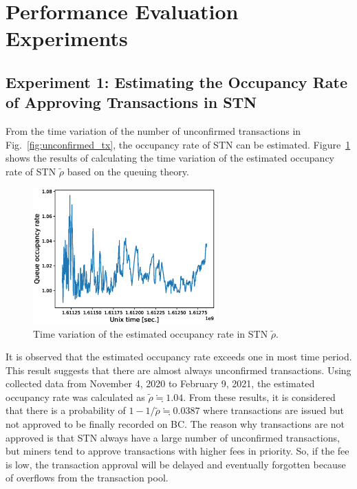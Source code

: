 \documentclass[graybox]{svmult}
\begin{document}
\section{Performance Evaluation Experiments}
\label{sec:experiments}

\subsection{Experiment 1: Estimating the Occupancy Rate of Approving Transactions in STN}
\label{sec:occupancyrate}

From the time variation of the number of unconfirmed transactions in Fig.~\ref{fig:unconfirmed_tx}, the occupancy rate of STN can be estimated. 
Figure~\ref{fig:occupancyrate} shows the results of calculating the time variation of the estimated occupancy rate of STN $\tilde{\rho}$ based on the queuing theory.
%
\begin{figure}[tb]
  \vspace{-35mm}
  \begin{center}
    \includegraphics[width=70mm]{bsv_stn-rho-queue_occupancy_rate.eps}
  \end{center}
  \vspace{35mm}
  \caption{Time variation of the estimated occupancy rate in STN $\tilde{\rho}$.}
  \label{fig:occupancyrate}
\end{figure}
%
 It is observed that the estimated occupancy rate exceeds one in most time period. 
This result suggests that there are almost always unconfirmed transactions. 
Using collected data from November 4, 2020 to February 9, 2021, the estimated occupancy rate was calculated as $\tilde{\rho} \fallingdotseq 1.04$. 
From these results, it is considered that there is a probability of $1 -1 / \tilde{\rho} \fallingdotseq 0.0387$ where transactions are issued but not approved to be finally recorded on BC. 
The reason why transactions are not approved is that STN always have a large number of unconfirmed transactions, but miners tend to approve transactions with higher fees in priority. So, if the fee is low, the transaction approval will be delayed and eventually forgotten because of overflows from the transaction pool. 
\end{document}
